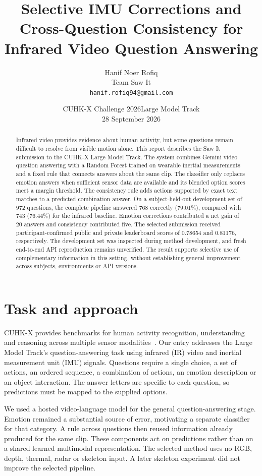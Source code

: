 \documentclass[12pt,a4paper]{article}
\title{Selective IMU Corrections and Cross-Question Consistency for Infrared Video Question Answering}
\author{Hanif Noer Rofiq\\Team Saw It\\\texttt{hanif.rofiq94@gmail.com}}
\date{CUHK-X Challenge 2026\quad Large Model Track\\28 September 2026}
\begin{document}
\maketitle
\begin{abstract}
Infrared video provides evidence about human activity, but some questions remain difficult to resolve from visible motion alone. This report describes the Saw It submission to the CUHK-X Large Model Track. The system combines Gemini video question answering with a Random Forest trained on wearable inertial measurements and a fixed rule that connects answers about the same clip. The classifier only replaces emotion answers when sufficient sensor data are available and its blended option scores meet a margin threshold. The consistency rule adds actions supported by exact text matches to a predicted combination answer. On a subject-held-out development set of 972 questions, the complete pipeline answered 768 correctly (79.01\%), compared with 743 (76.44\%) for the infrared baseline. Emotion corrections contributed a net gain of 20 answers and consistency contributed five. The selected submission received participant-confirmed public and private leaderboard scores of 0.78654 and 0.81176, respectively. The development set was inspected during method development, and fresh end-to-end API reproduction remains unverified. The result supports selective use of complementary information in this setting, without establishing general improvement across subjects, environments or API versions.
\end{abstract}

\section{Task and approach}
CUHK-X provides benchmarks for human activity recognition, understanding and reasoning across multiple sensor modalities~\cite{cuhkx}. Our entry addresses the Large Model Track's question-answering task using infrared (IR) video and inertial measurement unit (IMU) signals. Questions require a single choice, a set of actions, an ordered sequence, a combination of actions, an emotion description or an object interaction. The answer letters are specific to each question, so predictions must be mapped to the supplied options.

We used a hosted video-language model for the general question-answering stage. Emotion remained a substantial source of error, motivating a separate classifier for that category. A rule across questions then reused information already produced for the same clip. These components act on predictions rather than on a shared learned multimodal representation. The selected method uses no RGB, depth, thermal, radar or skeleton input. A later skeleton experiment did not improve the selected pipeline.
\end{document}
